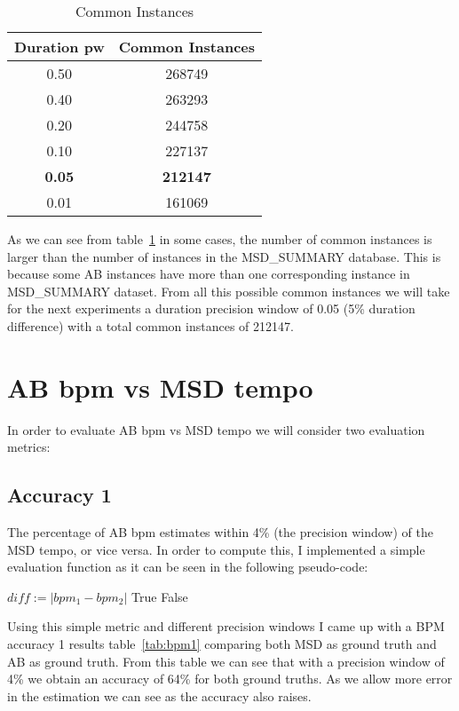 \documentclass[a4paper]{article}
\begin{document}
\begin{table}[ht!]
\centering
\begin{tabular}{cc}
\textbf{Duration pw} & \textbf{Common Instances} \\ \hline 
0.50 & 268749 \\
0.40 & 263293 \\
0.20 & 244758 \\
0.10 & 227137 \\
\textbf{0.05} & \textbf{212147} \\
0.01 & 161069 \\ \hline
\end{tabular}
\caption{Common Instances}
\label{tab:com}
\end{table}

As we can see from table~\ref{tab:com} in some cases, the number of common instances is larger than the number of instances in the MSD\_SUMMARY database. This is because some AB instances have more than one corresponding instance in MSD\_SUMMARY dataset. From all this possible common instances we will take for the next experiments a duration precision window of 0.05 (5\% duration difference) with a total common instances of 212147.

\section{AB bpm vs MSD tempo}
In order to evaluate AB bpm vs MSD tempo we will consider two evaluation metrics:

\subsection{Accuracy 1} 
The percentage of AB bpm estimates within 4\% (the precision window) of the MSD tempo, or vice versa. In order to compute this, I implemented a simple evaluation function as it can be seen in the following pseudo-code:

\begin{algorithmic}
\State $diff := |bpm_1 - bpm_2|$
    \Return True
\Else
    \Return False
\EndIf
\EndFunction
\end{algorithmic}

Using this simple metric and different precision windows I came up with a BPM accuracy 1 results table~\ref{tab:bpm1} comparing both MSD as ground truth and AB as ground truth. From this table we can see that with a precision window of 4\% we obtain an accuracy of 64\% for both ground truths. As we allow more error in the estimation we can see as the accuracy also raises.
\end{document}
